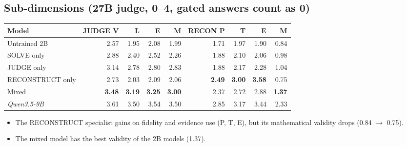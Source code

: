 \documentclass[10pt,a4paper]{article}
\begin{document}
\subsection{Sub-dimensions (27B judge, 0--4, gated answers count as 0)}
\begin{table}[H]
\centering\small
\begin{tabular}{lrrrrrrrr}
\toprule
Model & JUDGE V & L & E & M & RECON P & T & E & M\\
\midrule
Untrained 2B & 2.57 & 1.95 & 2.08 & 1.99 & 1.71 & 1.97 & 1.90 & 0.84\\
SOLVE only & 2.88 & 2.40 & 2.52 & 2.26 & 1.88 & 2.10 & 2.06 & 0.98\\
JUDGE only & 3.14 & 2.78 & 2.80 & 2.83 & 1.88 & 2.17 & 2.28 & 1.04\\
RECONSTRUCT only & 2.73 & 2.03 & 2.09 & 2.06 & \textbf{2.49} & \textbf{3.00} & \textbf{3.58} & 0.75\\
Mixed & \textbf{3.48} & \textbf{3.19} & \textbf{3.25} & \textbf{3.00} & 2.37 & 2.72 & 2.88 & \textbf{1.37}\\
\textit{Qwen3.5-9B} & 3.61 & 3.50 & 3.54 & 3.50 & 2.85 & 3.17 & 3.44 & 2.33\\
\bottomrule
\end{tabular}
\end{table}
\noindent
\begin{itemize}
\item The RECONSTRUCT specialist gains on fidelity and evidence use (P, T, E), but its mathematical validity drops
      (0.84 $\rightarrow$ 0.75).
\item The mixed model has the best validity of the 2B models (1.37).
\end{itemize}
\end{document}
